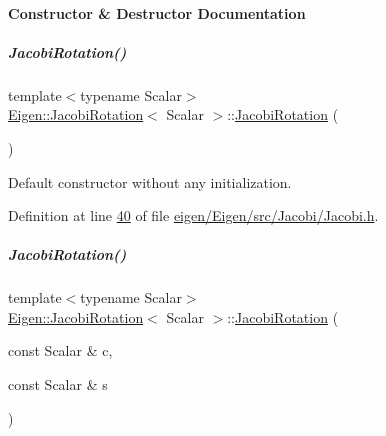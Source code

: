 \paragraph{Constructor \& Destructor Documentation}
\mbox{\label{group___jacobi___module_a38fec2c4da529ef3d05ff37b848b4227}} 
\subparagraph{\texorpdfstring{Jacobi\+Rotation()}{JacobiRotation()}\hspace{0.1cm}{\footnotesize\ttfamily [1/4]}}
{\footnotesize\ttfamily template$<$typename Scalar$>$ \\
\hyperlink{group___jacobi___module_class_eigen_1_1_jacobi_rotation}{Eigen\+::\+Jacobi\+Rotation}$<$ Scalar $>$\+::\hyperlink{group___jacobi___module_class_eigen_1_1_jacobi_rotation}{Jacobi\+Rotation} (\begin{DoxyParamCaption}{ }\end{DoxyParamCaption})\hspace{0.3cm}{\ttfamily [inline]}}

Default constructor without any initialization. 

Definition at line \hyperlink{eigen_2_eigen_2src_2_jacobi_2_jacobi_8h_source_l00040}{40} of file \hyperlink{eigen_2_eigen_2src_2_jacobi_2_jacobi_8h_source}{eigen/\+Eigen/src/\+Jacobi/\+Jacobi.\+h}.

\mbox{\label{group___jacobi___module_a3e8b5dc0a56f7a2d0f788b1ccb1547cb}} 
\subparagraph{\texorpdfstring{Jacobi\+Rotation()}{JacobiRotation()}\hspace{0.1cm}{\footnotesize\ttfamily [2/4]}}
{\footnotesize\ttfamily template$<$typename Scalar$>$ \\
\hyperlink{group___jacobi___module_class_eigen_1_1_jacobi_rotation}{Eigen\+::\+Jacobi\+Rotation}$<$ Scalar $>$\+::\hyperlink{group___jacobi___module_class_eigen_1_1_jacobi_rotation}{Jacobi\+Rotation} (\begin{DoxyParamCaption}\item[{const Scalar \&}]{c,  }\item[{const Scalar \&}]{s }\end{DoxyParamCaption})\hspace{0.3cm}{\ttfamily [inline]}}

